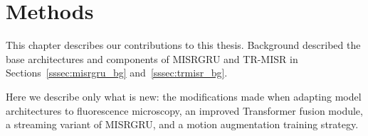 \chapter{Methods}
\label{ch:method}
This chapter describes our contributions to this thesis.
Background described the base architectures and components of MISRGRU 
and TR-MISR in
Sections~\ref{sssec:misrgru_bg} and~\ref{sssec:trmisr_bg}.

Here we describe only what is new: the modifications made when adapting model architectures to
fluorescence microscopy, an improved Transformer fusion module, a streaming variant of MISRGRU,
and a motion augmentation training strategy.





  
  



